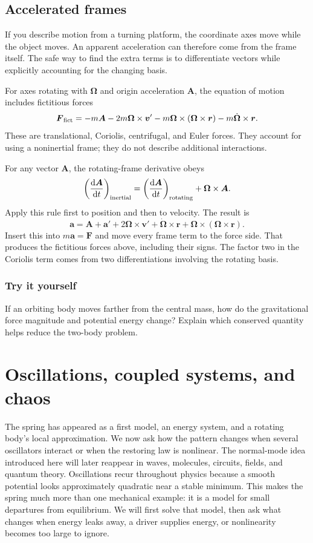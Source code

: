 \documentclass[11pt,oneside]{book}
\newcommand{\dd}{\mathrm{d}}
\newcommand{\vect}[1]{\boldsymbol{#1}}
\newcommand{\od}[2]{\frac{\dd #1}{\dd #2}}
\theoremstyle{reviewstyle}
\newcommand{\learningcheck}[1]{\subsection*{Try it yourself}\noindent #1\par}
\begin{document}
\section{Accelerated frames}
If you describe motion from a turning platform, the coordinate axes move while the object moves. An apparent acceleration can therefore come from the frame itself. The safe way to find the extra terms is to differentiate vectors while explicitly accounting for the changing basis.

For axes rotating with $\vect\Omega$ and origin acceleration $\vect A$, the equation of motion includes fictitious forces
\begin{equation}
\vect F_{\rm fict}=-m\vect A-2m\vect\Omega\times\vect v'
-m\vect\Omega\times(\vect\Omega\times\vect r)
-m\dot{\vect\Omega}\times\vect r.
\end{equation}
These are translational, Coriolis, centrifugal, and Euler forces. They account for using a noninertial frame; they do not describe additional interactions.

For any vector $\vect A$, the rotating-frame derivative obeys
\begin{equation}
\left(\od{\vect A}{t}\right)_{\rm inertial}
=\left(\od{\vect A}{t}\right)_{\rm rotating}+\vect\Omega\times\vect A.
\end{equation}
Apply this rule first to position and then to velocity. The result is
\begin{equation}
\vect a=\vect A+\vect a'+2\vect\Omega\times\vect v'
+\dot{\vect\Omega}\times\vect r+\vect\Omega\times(\vect\Omega\times\vect r).
\end{equation}
Insert this into $m\vect a=\vect F$ and move every frame term to the force side. That produces the fictitious forces above, including their signs. The factor two in the Coriolis term comes from two differentiations involving the rotating basis.

\learningcheck{If an orbiting body moves farther from the central mass, how do the gravitational force magnitude and potential energy change? Explain which conserved quantity helps reduce the two-body problem.}

\chapter{Oscillations, coupled systems, and chaos}
The spring has appeared as a first model, an energy system, and a rotating body's local approximation. We now ask how the pattern changes when several oscillators interact or when the restoring law is nonlinear. The normal-mode idea introduced here will later reappear in waves, molecules, circuits, fields, and quantum theory.
Oscillations recur throughout physics because a smooth potential looks approximately quadratic near a stable minimum. This makes the spring much more than one mechanical example: it is a model for small departures from equilibrium. We will first solve that model, then ask what changes when energy leaks away, a driver supplies energy, or nonlinearity becomes too large to ignore.
\end{document}
